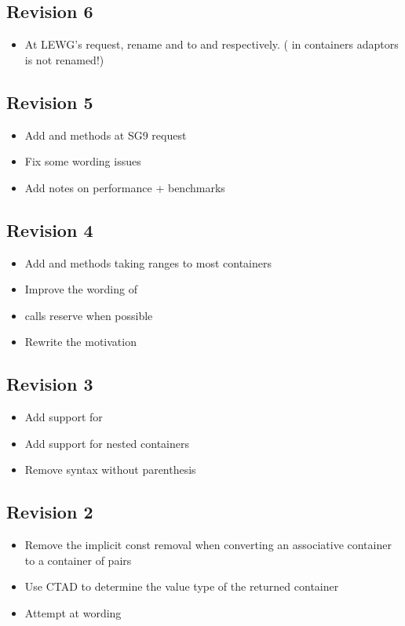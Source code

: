 \documentclass{wg21}
\begin{document}
\subsection*{Revision 6}
\begin{itemize}
    \item At LEWG's request, rename  and  to  and  respectively.
    ( in containers adaptors is not renamed!)
\end{itemize}


\subsection*{Revision 5}
\begin{itemize}
    \item Add  and  methods at SG9 request
    \item Fix some wording issues
    \item Add notes on performance + benchmarks
\end{itemize}

\subsection*{Revision 4}
\begin{itemize}
    \item Add  and methods taking ranges to most containers
    \item Improve the wording of 
    \item {} calls reserve when possible
    \item Rewrite the motivation
\end{itemize}

\subsection*{Revision 3}
\begin{itemize}
    \item Add support for 
    \item Add support for nested containers
    \item Remove syntax without parenthesis
\end{itemize}

\subsection*{Revision 2}
\begin{itemize}
    \item Remove the implicit const removal when converting an associative container to a container of pairs
    \item Use CTAD to determine the value type of the returned container
    \item Attempt at wording
\end{itemize}
\end{document}

